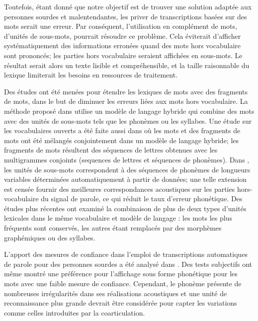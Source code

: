 \documentclass[10pt,a4paper,twoside]{article}
\begin{document}
Toutefois, étant donné que notre objectif est de trouver une solution adaptée aux personnes sourdes et malentendantes, les priver de transcriptions basées sur des mots serait une erreur. Par conséquent, l'utilisation en complément de mots, d'unités de sous-mots, pourrait résoudre ce problème. Cela éviterait d'afficher systématiquement des informations erronées quand des mots hors vocabulaire sont prononcés; les parties hors vocabulaire seraient affichées en sous-mots. Le résultat serait alors un texte lisible et compréhensible, et la taille raisonnable du lexique limiterait les besoins en ressources de traitement.

Des études ont été menées pour étendre les lexiques de mots avec des fragments de mots, dans le but de diminuer les erreurs liées aux mots hors vocabulaire. 
La méthode proposé dans \cite{Yazgan2004} utilise un modèle de langage hybride qui combine des mots avec des unités de sous-mots tels que les phonèmes ou les syllabes. 
Une étude sur les vocabulaires ouverts a été faite aussi dans \cite{Bisani2005} où les mots et des fragments de mots ont été mélangés conjointement dans un modèle de langage hybride; les fragments de mots résultent des séquences de lettres obtenues avec les multigrammes conjoints (sequences de lettres et séquences de phonèmes). 
Dans \cite{Rastrow2009}, les unités de sous-mots correspondent à des séquences de phonèmes de longueurs variables déterminées automatiquement à partir de données; une telle extension est censée fournir des meilleures correspondances acoustiques sur les parties hors-vocabulaire du signal de parole, ce qui réduit le taux d'erreur phonétique. 
Des études plus récentes \cite{shaik2011} ont examiné la combinaison de plus de deux types d'unités lexicales dans le même vocabulaire et modèle de langage : les mots les plus fréquents sont conservés, les autres étant remplacés par des morphèmes graphémiques ou des syllabes.  

L'apport des mesures de confiance \cite{Jiang2005} dans l'emploi de transcriptions automatiques de parole pour des personnes sourdes a été analysé dans \cite{Razik2008}. Des tests subjectifs ont même montré une préférence pour l'affichage sous forme phonétique pour les mots avec une faible mesure de confiance. Cependant, le phonème présente de nombreuses irrégularités dans ses réalisations acoustiques et une unité de reconnaissance plus grande devrait être considérée pour capter les variations comme celles introduites par la coarticulation.
\end{document}
